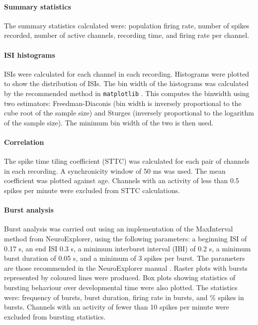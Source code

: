 \documentclass[11pt]{article}
\begin{document}
{\paragraph{Summary statistics} The summary statistics calculated were: population firing rate, number of spikes recorded, number of active channels, recording time, and firing rate per channel.

\paragraph{ISI histograms} ISIs were calculated for each channel in each recording. Histograms were plotted to show the distribution of ISIs. The bin width of the histograms was calculated by the recommended method in \texttt{matplotlib} \cite{Community2020-xp}. This computes the binwidth using two estimators: Freedman-Diaconis (bin width is inversely proportional to the cube root of the sample size) and Sturges (inversely proportional to the logarithm of the sample size). The minimum bin width of the two is then used.

\paragraph{Correlation} The spike time tiling coefficient (STTC) \cite{Cutts2014} was calculated for each pair of channels in each recording. A synchronicity window of 50 ms was used. The mean coefficient was plotted against age. Channels with an activity of less than 0.5 spikes per minute were excluded from STTC calculations.

\paragraph{Burst analysis} Burst analysis was carried out using an implementation of the MaxInterval method from NeuroExplorer, using the following parameters: a beginning ISI of 0.17 s, an end ISI 0.3 s, a minimum interburst interval (IBI) of 0.2 s, a minimum burst duration of 0.05 s, and a minimum of 3 spikes per burst. The parameters are those recommended in the NeuroExplorer manual \cite{neuroexplorer2020}. Raster plots with bursts represented by coloured lines were produced. Box plots showing statistics of bursting behaviour over developmental time were also plotted. The statistics were: frequency of bursts, burst duration, firing rate in bursts, and \% spikes in bursts. Channels with an activity of fewer than 10 spikes per minute were excluded from bursting statistics.

}
\end{document}
